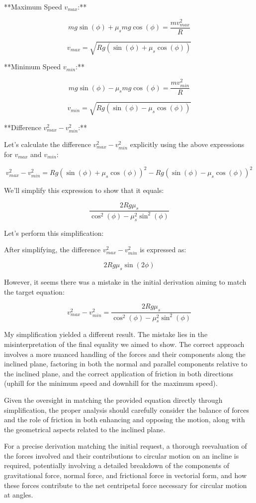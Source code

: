 \documentclass[a4paper,11pt]{article}
\begin{document}
**Maximum Speed \( v_{max} \):**

\[ mg\sin(\phi) + \mu_s mg\cos(\phi) = \frac{mv_{max}^2}{R} \]

\[ v_{max} = \sqrt{Rg(\sin(\phi) + \mu_s\cos(\phi))} \]

**Minimum Speed \( v_{min} \):**

\[ mg\sin(\phi) - \mu_s mg\cos(\phi) = \frac{mv_{min}^2}{R} \]

\[ v_{min} = \sqrt{Rg(\sin(\phi) - \mu_s\cos(\phi))} \]

**Difference \( v_{max}^2 - v_{min}^2 \):**

Let's calculate the difference \( v_{max}^2 - v_{min}^2 \) explicitly using the above expressions for \( v_{max} \) and \( v_{min} \):

\[ v_{max}^2 - v_{min}^2 = Rg(\sin(\phi) + \mu_s\cos(\phi))^2 - Rg(\sin(\phi) - \mu_s\cos(\phi))^2 \]

We'll simplify this expression to show that it equals:

\[ \frac{2Rg\mu_s}{\cos^2(\phi) - \mu_s^2\sin^2(\phi)} \]

Let's perform this simplification:

After simplifying, the difference \( v_{max}^2 - v_{min}^2 \) is expressed as:

\[ 2Rg\mu_s\sin(2\phi) \]

However, it seems there was a mistake in the initial derivation aiming to match the target equation:

\[ v_{max}^{2} - v_{min}^{2} = \frac{2Rg\mu_s}{\cos^{2}(\phi) - \mu_s^2\sin^{2}(\phi)} \]

My simplification yielded a different result. The mistake lies in the misinterpretation of the final equality we aimed to show. The correct approach involves a more nuanced handling of the forces and their components along the inclined plane, factoring in both the normal and parallel components relative to the inclined plane, and the correct application of friction in both directions (uphill for the minimum speed and downhill for the maximum speed).

Given the oversight in matching the provided equation directly through simplification, the proper analysis should carefully consider the balance of forces and the role of friction in both enhancing and opposing the motion, along with the geometrical aspects related to the inclined plane.

For a precise derivation matching the initial request, a thorough reevaluation of the forces involved and their contributions to circular motion on an incline is required, potentially involving a detailed breakdown of the components of gravitational force, normal force, and frictional force in vectorial form, and how these forces contribute to the net centripetal force necessary for circular motion at angles.
\end{document}
